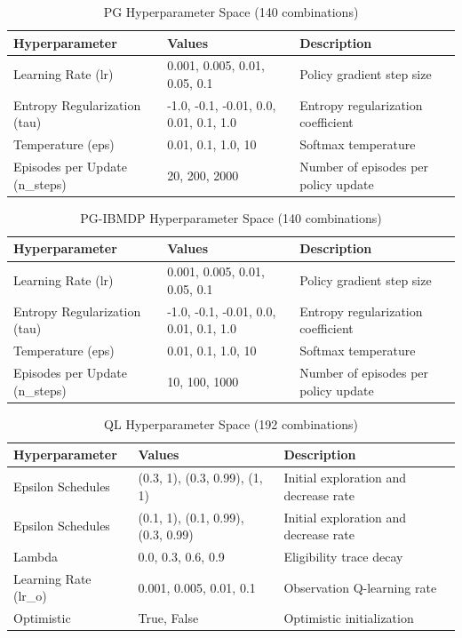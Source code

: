 \begin{table}
\small
\centering
\caption{PG Hyperparameter Space (140 combinations)}
\begin{tabular}{lll}
\toprule
\textbf{Hyperparameter} & \textbf{Values} & \textbf{Description} \\
\midrule
Learning Rate (lr) & 0.001, 0.005, 0.01, 0.05, 0.1 & Policy gradient step size \\
Entropy Regularization (tau) & -1.0, -0.1, -0.01, 0.0, 0.01, 0.1, 1.0 & Entropy regularization coefficient \\
Temperature (eps) & 0.01, 0.1, 1.0, 10 & Softmax temperature \\
Episodes per Update (n\_steps) & 20, 200, 2000 & Number of episodes per policy update \\
\bottomrule
\end{tabular}
\end{table}

\begin{table}
\small
\centering
\caption{PG-IBMDP Hyperparameter Space (140 combinations)}
\begin{tabular}{lll}
\toprule
\textbf{Hyperparameter} & \textbf{Values} & \textbf{Description} \\
\midrule
Learning Rate (lr) & 0.001, 0.005, 0.01, 0.05, 0.1 & Policy gradient step size \\
Entropy Regularization (tau) & -1.0, -0.1, -0.01, 0.0, 0.01, 0.1, 1.0 & Entropy regularization coefficient \\
Temperature (eps) & 0.01, 0.1, 1.0, 10 & Softmax temperature \\
Episodes per Update (n\_steps) & 10, 100, 1000 & Number of episodes per policy update \\
\bottomrule
\end{tabular}
\end{table}


\begin{table}
\small
\centering
\caption{QL Hyperparameter Space (192 combinations)}
\begin{tabular}{lll}
\toprule
\textbf{Hyperparameter} & \textbf{Values} & \textbf{Description} \\
\midrule
Epsilon Schedules & (0.3, 1), (0.3, 0.99), (1, 1) & Initial exploration and decrease rate \\
Epsilon Schedules & (0.1, 1), (0.1, 0.99), (0.3, 0.99) & Initial exploration and decrease rate \\
Lambda & 0.0, 0.3, 0.6, 0.9 & Eligibility trace decay \\
Learning Rate (lr\_o) & 0.001, 0.005, 0.01, 0.1 & Observation Q-learning rate \\
Optimistic & True, False & Optimistic initialization \\
\bottomrule
\end{tabular}
\end{table}

